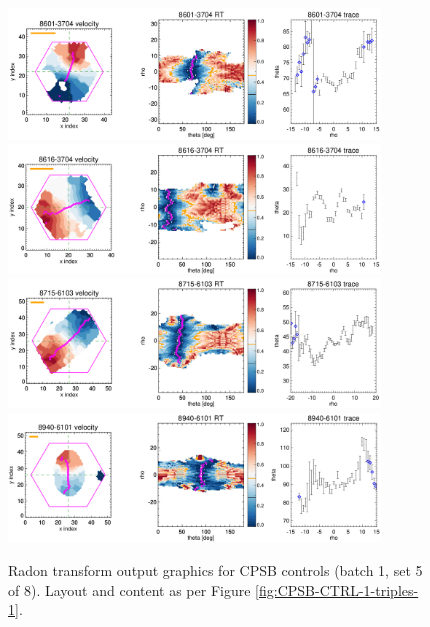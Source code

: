\documentclass[fleqn,usenatbib]{mnras}
\begin{document}
\begin{figure}
    \centering
    \includegraphics[width=0.88\textwidth]{Images/SN1-MC250/CPSB-CTRL-1-triples/8601-3704-1-250-10.png}
    \includegraphics[width=0.88\textwidth]{Images/SN1-MC250/CPSB-CTRL-1-triples/8616-3704-1-250-10.png}
    \includegraphics[width=0.88\textwidth]{Images/SN1-MC250/CPSB-CTRL-1-triples/8715-6103-1-250-10.png}
    \includegraphics[width=0.88\textwidth]{Images/SN1-MC250/CPSB-CTRL-1-triples/8940-6101-1-250-10.png}    
    \caption{Radon transform output graphics for CPSB controls (batch 1, set 5 of 8). Layout and content as per Figure \ref{fig:CPSB-CTRL-1-triples-1}.}
    \label{fig:CPSB-CTRL-1-triples-5}
\end{figure}
\end{document}
